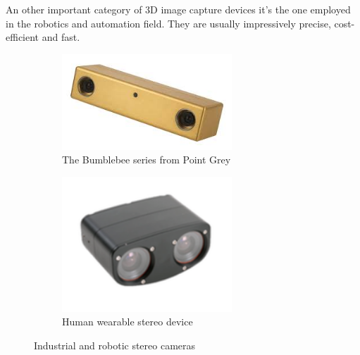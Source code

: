 An other important category of 3D image capture devices it's the one employed in the robotics and automation field. They are usually impressively precise, cost-efficient and fast.
\begin{figure}[h!]
\centering
\begin{subfigure}[]{0.4\textwidth}
\centering
\includegraphics[width=0.7\textwidth]{./img/bumble.jpg}
\caption{\scriptsize{The Bumblebee series from Point Grey}}
\end{subfigure}
\begin{subfigure}[]{0.3\textwidth}
\centering
\includegraphics[width=0.7\textwidth]{./img/stereodevices.png}
\caption{\scriptsize{Human wearable stereo device}}
\end{subfigure}
\caption{\small{Industrial and robotic stereo cameras}}
\end{figure}
